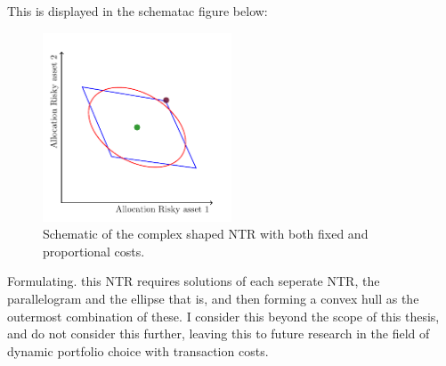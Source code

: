 \documentclass[11pt]{article}
\begin{document}
This is displayed in the schematac figure below:
\begin{figure}[!ht]
    \centering
    \includegraphics[width=0.5\textwidth]{../Sections/Tikz Final Figure.pdf}
    \caption{Schematic of the complex shaped NTR with both fixed and proportional costs.}
    \label{fig: Tikz_Final_TR}
\end{figure}
Formulating. this NTR requires solutions of each seperate NTR, the parallelogram and the ellipse that is, and then forming a convex hull as the outermost combination of these. 
I consider this beyond the scope of this thesis, and do not consider this further, leaving this to future research in the field of dynamic portfolio choice with transaction costs. 



\ifdefined\COMPILINGMAIN
\else
\end{document}
